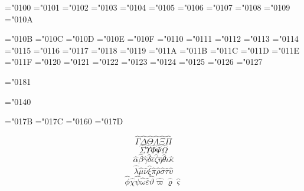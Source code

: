 

\hoffset=-2.5in
\voffset=-0.2in

\nopagenumbers




\mathchardef\varGamma="0100
\mathchardef\varDelta="0101
\mathchardef\varTheta="0102
\mathchardef\varLambda="0103
\mathchardef\varXi="0104
\mathchardef\varPi="0105
\mathchardef\varSigma="0106
\mathchardef\varUpsilon="0107
\mathchardef\varPhi="0108
\mathchardef\varPsi="0109
\mathchardef\varOmega="010A

\mathchardef\alpha="010B
\mathchardef\beta="010C
\mathchardef\gamma="010D
\mathchardef\delta="010E
\mathchardef\epsilon="010F
\mathchardef\zeta="0110
\mathchardef\eta="0111
\mathchardef\theta="0112
\mathchardef\iota="0113
\mathchardef\kappa="0114
\mathchardef\lambda="0115
\mathchardef\mu="0116
\mathchardef\nu="0117
\mathchardef\xi="0118
\mathchardef\pi="0119
\mathchardef\rho="011A
\mathchardef\sigma="011B
\mathchardef\tau="011C
\mathchardef\upsilon="011D
\mathchardef\phi="011E
\mathchardef\chi="011F
\mathchardef\psi="0120
\mathchardef\omega="0121
\mathchardef\varepsilon="0122
\mathchardef\vartheta="0123
\mathchardef\varpi="0124
\mathchardef\varrho="0125
\mathchardef\varsigma="0126
\mathchardef\varphi="0127

\mathchardef\omicron="0181

\mathchardef\partial="0140

\mathchardef\imath="017B
\mathchardef\jmath="017C
\mathchardef\ell="0160
\mathchardef\wp="017D


$$
\hat{\varGamma} 
\hat{\varDelta} 
\hat{\varTheta} 
\hat{\varLambda} 
\hat{\varXi} 
\hat{\varPi} 
$$
%
$$
\hat{\varSigma} 
\hat{\varUpsilon} 
\hat{\varPhi} 
\hat{\varPsi} 
\hat{\varOmega} 
$$
%
$$
\hat{\alpha} 
\hat{\beta} 
\hat{\gamma} 
\hat{\delta} 
\hat{\epsilon} 
\hat{\zeta} 
\hat{\eta} 
\hat{\theta} 
\hat{\iota} 
\hat{\kappa} 
$$
%
$$
\hat{\lambda} 
\hat{\mu} 
\hat{\nu} 
\hat{\xi} 
\hat{\pi} 
\hat{\rho} 
\hat{\sigma} 
\hat{\tau} 
\hat{\upsilon} 
$$
%
$$
\hat{\phi} 
\hat{\chi} 
\hat{\psi} 
\hat{\omega} 
\hat{\varepsilon} 
\hat{\vartheta} 
\hat{\varpi} 
\hat{\varrho} 
\hat{\varsigma} 
$$

